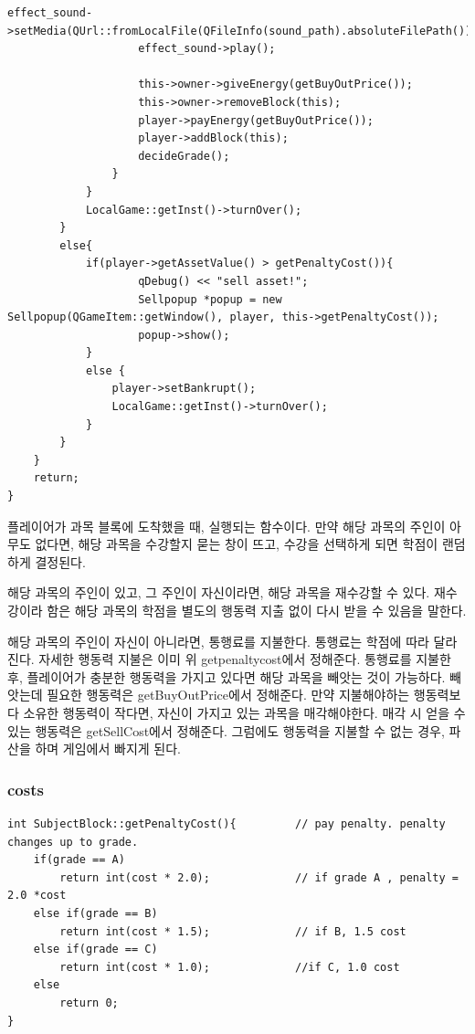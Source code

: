 \documentclass[10pt,oneside,a4paper,titlepage]{article}
\begin{document}
\begin{lstlisting}[escapeinside=~~]
                    effect_sound->setMedia(QUrl::fromLocalFile(QFileInfo(sound_path).absoluteFilePath()));
                    effect_sound->play();

                    this->owner->giveEnergy(getBuyOutPrice());
                    this->owner->removeBlock(this);
                    player->payEnergy(getBuyOutPrice());
                    player->addBlock(this);
                    decideGrade();
                }
            }
            LocalGame::getInst()->turnOver();
        }
        else{
            if(player->getAssetValue() > getPenaltyCost()){
                    qDebug() << "sell asset!";
                    Sellpopup *popup = new Sellpopup(QGameItem::getWindow(), player, this->getPenaltyCost());
                    popup->show(); 
            }
            else {
                player->setBankrupt();
                LocalGame::getInst()->turnOver();
            }
        }
    }
    return;
}
\end{lstlisting}

플레이어가 과목 블록에 도착했을 때, 실행되는 함수이다.
만약 해당 과목의 주인이 아무도 없다면, 해당 과목을 수강할지 묻는 창이 뜨고, 수강을 선택하게 되면 학점이 랜덤하게 결정된다.
 
해당 과목의 주인이 있고, 그 주인이 자신이라면, 해당 과목을 재수강할 수 있다. 
재수강이라 함은 해당 과목의 학점을 별도의 행동력 지출 없이 다시 받을 수 있음을 말한다.

해당 과목의 주인이 자신이 아니라면, 통행료를 지불한다. 통행료는 학점에 따라 달라진다.
자세한 행동력 지불은 이미 위 getpenaltycost에서 정해준다.
통행료를 지불한 후, 플레이어가 충분한 행동력을 가지고 있다면 해당 과목을 빼앗는 것이 가능하다. 빼앗는데 필요한 행동력은 getBuyOutPrice에서 정해준다.
만약 지불해야하는 행동력보다 소유한 행동력이 작다면, 자신이 가지고 있는 과목을 매각해야한다. 매각 시 얻을 수 있는 행동력은 getSellCost에서 정해준다.
그럼에도 행동력을 지불할 수 없는 경우, 파산을 하며 게임에서 빠지게 된다. 

\subsubsection{costs}
\begin{lstlisting}
int SubjectBlock::getPenaltyCost(){         // pay penalty. penalty changes up to grade.
    if(grade == A)
        return int(cost * 2.0);             // if grade A , penalty = 2.0 *cost
    else if(grade == B)
        return int(cost * 1.5);             // if B, 1.5 cost
    else if(grade == C)
        return int(cost * 1.0);             //if C, 1.0 cost
    else
        return 0;
}
\end{lstlisting}
\end{document}
